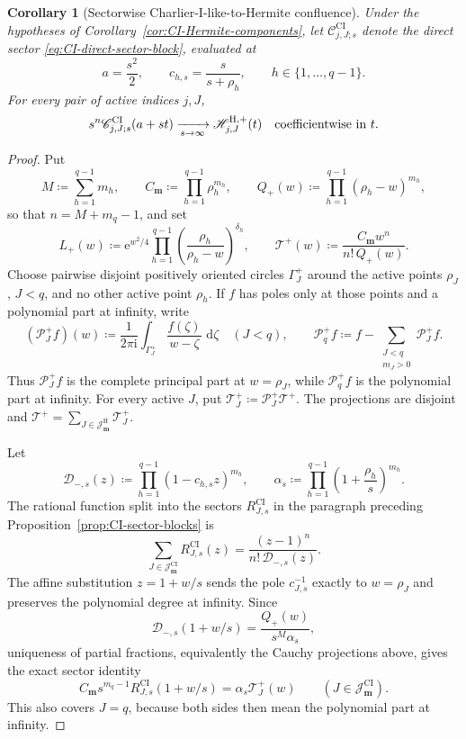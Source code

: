 \documentclass[10pt]{amsart}
\newcommand{\e}{\mathrm e}
\newcommand{\dd}{\,\mathrm d}
\newcommand{\mm}{\boldsymbol m}
\theoremstyle{plain}
\newtheorem{corollary}[theorem]{Corollary}
\theoremstyle{definition}
\theoremstyle{remark}
\begin{document}
\begin{corollary}[Sectorwise Charlier-I-like-to-Hermite confluence]
\label{cor:CI-Hermite-sector-limit}
Under the hypotheses of Corollary~\ref{cor:CI-Hermite-components}, let
\(\mathscr C_{j,J;s}^{\mathrm{CI}}\) denote the direct sector
\eqref{eq:CI-direct-sector-block}, evaluated at
\[
 a=\frac{s^2}{2},
 \qquad c_{h,s}=\frac{s}{s+\rho_h},
 \qquad h\in\{1,\ldots,q-1\}.
\]
For every pair of active indices \(j,J\),
\begin{equation}
 s^n\mathscr C_{j,J;s}^{\mathrm{CI}}(a+st)
 \xrightarrow[s\to\infty]{}
 \mathscr H_{j,J}^{\mathrm H,+}(t)
 \quad\hbox{coefficientwise in }t .
 \label{eq:CI-Hermite-sector-limit}
\end{equation}
\end{corollary}

\begin{proof}
Put
\[
 M\coloneq\sum_{h=1}^{q-1}m_h,\qquad
 C_{\mm}\coloneq\prod_{h=1}^{q-1}\rho_h^{m_h},\qquad
 Q_+(w)\coloneq\prod_{h=1}^{q-1}(\rho_h-w)^{m_h},
\]
so that \(n=M+m_q-1\), and set
\[
 L_+(w)\coloneq
 \e^{w^2/4}\prod_{h=1}^{q-1}
 \left(\frac{\rho_h}{\rho_h-w}\right)^{\delta_h},
 \qquad
 \mathcal T^+(w)\coloneq
 \frac{C_{\mm}w^n}{n!\,Q_+(w)}.
\]
Choose pairwise disjoint positively oriented circles
\(\Gamma_J^+\) around the active points \(\rho_J\), \(J<q\), and no
other active point \(\rho_h\).  If \(f\) has poles only at those points and a
polynomial part at infinity, write
\[
 (\mathcal P_J^+f)(w)\coloneq
 \frac{1}{2\pi\mathrm i}\int_{\Gamma_J^+}
 \frac{f(\zeta)}{w-\zeta}\,\dd\zeta
 \quad(J<q),\qquad
 \mathcal P_q^+f\coloneq
 f-\sum_{\substack{J<q\\m_J>0}}\mathcal P_J^+f .
\]
Thus \(\mathcal P_J^+f\) is the complete principal part at
\(w=\rho_J\), while \(\mathcal P_q^+f\) is the polynomial part at
infinity.  For every active \(J\), put
\(\mathcal T_J^+\coloneq\mathcal P_J^+\mathcal T^+\).
The projections are disjoint and
\(\mathcal T^+=\sum_{J\in\mathcal J_{\mm}^{\mathrm H}}
\mathcal T_J^+\).

Let
\[
 \mathcal D_{-,s}(z)\coloneq
 \prod_{h=1}^{q-1}(1-c_{h,s}z)^{m_h},\qquad
 \alpha_s\coloneq
 \prod_{h=1}^{q-1}\left(1+\frac{\rho_h}{s}\right)^{m_h}.
\]
The rational function split into the sectors
\(R_{J,s}^{\mathrm{CI}}\) in the paragraph preceding
Proposition~\ref{prop:CI-sector-blocks} is
\[
 \sum_{J\in\mathcal J_{\mm}^{\mathrm{CI}}}
 R_{J,s}^{\mathrm{CI}}(z)
 =\frac{(z-1)^n}{n!\,\mathcal D_{-,s}(z)}.
\]
The affine substitution \(z=1+w/s\) sends the pole
\(c_{J,s}^{-1}\) exactly to \(w=\rho_J\) and preserves the polynomial
degree at infinity.  Since
\[
 \mathcal D_{-,s}(1+w/s)
 =\frac{Q_+(w)}{s^M\alpha_s},
\]
uniqueness of partial fractions, equivalently the Cauchy projections
above, gives the exact sector identity
\begin{equation}
 C_{\mm}s^{m_q-1}
 R_{J,s}^{\mathrm{CI}}(1+w/s)
 =\alpha_s\mathcal T_J^+(w)
 \qquad(J\in\mathcal J_{\mm}^{\mathrm{CI}}).
 \label{eq:CI-Hermite-exact-sector-source}
\end{equation}
This also covers \(J=q\), because both sides then mean the polynomial
part at infinity.


\end{proof}
\end{document}
